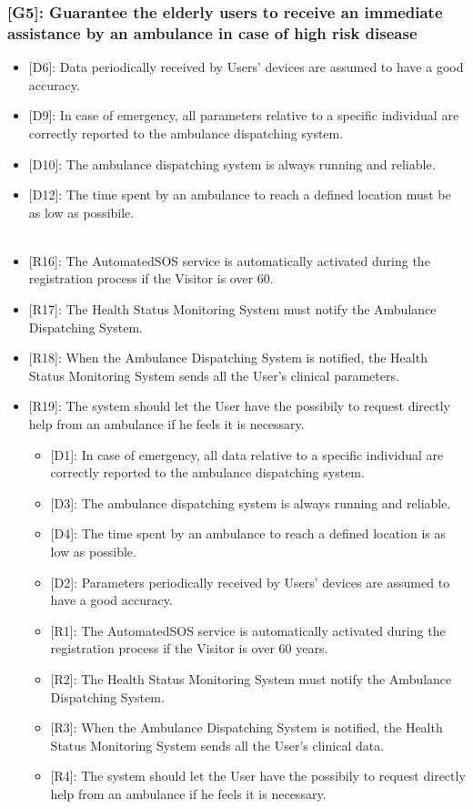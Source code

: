 \documentclass[12pt,a4paper]{article}
\begin{document}
	\subsubsection*{{[}{G5}{]}: Guarantee the elderly users to receive an immediate assistance by an ambulance in case of high risk disease}
	\begin{itemize}
		\item {[D6]}: Data periodically received by Users' devices are assumed to have a good accuracy. 
		\item {[D9]}: In case of emergency, all parameters relative to a specific individual are correctly reported to the ambulance dispatching system.
		\item {[D10]}: The ambulance dispatching system is always running and reliable.
		\item {[D12]}: The time spent by an ambulance to reach a defined location must be as low as possibile.
		\\\\
		\item {[R16]}: The AutomatedSOS service is automatically activated during the registration process if the Visitor is over 60.
		\item {[R17]}: The Health Status Monitoring System must notify the Ambulance Dispatching System. 
		\item {[R18]}: When the Ambulance Dispatching System is notified, the Health Status Monitoring System sends all the User's clinical parameters.
		\item {[R19]}: The system should let the User have the possibily to request directly help from an ambulance if he feels it is necessary.
		\begin{itemize}
			\item {[D1]}: In case of emergency, all data relative to a specific individual are correctly reported to the ambulance dispatching system.
			\item {[D3]}: The ambulance dispatching system is always running and reliable.
			\item {[D4]}: The time spent by an ambulance to reach a defined location is as low as possible.
			\item {[D2]}: Parameters periodically received by Users' devices are assumed to have a good accuracy. 
			
			\item {[R1]}: The AutomatedSOS service is automatically activated during the registration process if the Visitor is over 60 years.
			\item {[R2]}: The Health Status Monitoring System must notify the Ambulance Dispatching System. 
			\item {[R3]}: When the Ambulance Dispatching System is notified, the Health Status Monitoring System sends all the User's clinical data.
			\item {[R4]}: The system should let the User have the possibily to request directly help from an ambulance if he feels it is necessary.
		\end{itemize}
	\end{itemize}
\end{document}
